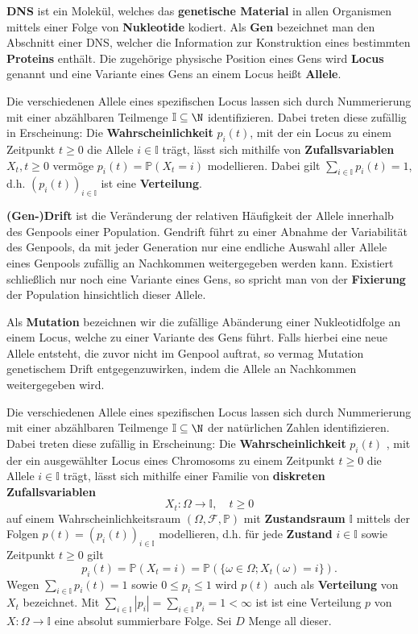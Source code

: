 \begin{bem}
\textbf{DNS} ist ein Molekül, welches das \textbf{genetische Material} in allen Organismen mittels einer Folge von \textbf{Nukleotide} kodiert. Als \textbf{Gen} bezeichnet man den Abschnitt einer DNS, welcher die Information zur Konstruktion eines bestimmten \textbf{Proteins} enthält. Die zugehörige physische Position eines Gens  wird \textbf{Locus} genannt und eine Variante eines Gens an einem Locus heißt  \textbf{Allele}.

\par Die verschiedenen Allele eines spezifischen Locus lassen sich durch Nummerierung mit einer abzählbaren Teilmenge $\mathbb I\subseteq \N$ identifizieren. Dabei treten diese zufällig in  Erscheinung: Die \textbf{Wahrscheinlichkeit} $p_i(t)$, mit der ein  Locus zu einem Zeitpunkt $t\geq 0$ die Allele $i\in\mathbb I$ trägt, lässt sich mithilfe von   \textbf{Zufallsvariablen} $X_t, t\geq0$ vermöge $p_i(t)=\mathbb P(X_t=i)$ modellieren. Dabei gilt $\sum_{i\in\mathbb I}p_i(t)=1$, d.h. $(p_i(t))_{i\in\mathbb I}$ ist eine \textbf{Verteilung}.

  \par \textbf{(Gen-)Drift} ist die Veränderung der relativen Häufigkeit der  Allele innerhalb des Genpools einer Population. Gendrift führt zu einer Abnahme der Variabilität des Genpools, da mit jeder Generation nur eine endliche Auswahl aller Allele eines Genpools zufällig an Nachkommen weitergegeben werden kann. Existiert schließlich nur noch eine Variante eines Gens, so spricht man von der \textbf{Fixierung} der Population hinsichtlich dieser Allele.
  
  \par  Als \textbf{Mutation} bezeichnen wir die zufällige Abänderung einer Nukleotidfolge an einem Locus, welche zu einer Variante des Gens führt. Falls hierbei eine neue Allele entsteht, die zuvor nicht im Genpool auftrat, so vermag Mutation genetischem Drift entgegenzuwirken, indem die Allele an Nachkommen weitergegeben wird.



  \par Die verschiedenen Allele eines spezifischen Locus lassen sich durch Nummerierung mit einer abzählbaren Teilmenge $\mathbb I\subseteq \N$ der natürlichen Zahlen identifizieren. Dabei treten diese zufällig in  Erscheinung: Die \textbf{Wahrscheinlichkeit} $p_i(t)$ , mit der ein ausgewählter Locus eines Chromosoms zu einem Zeitpunkt $t\geq 0$ die Allele $i\in\mathbb I$ trägt, lässt sich mithilfe einer Familie von  \textbf{diskreten Zufallsvariablen} $$X_t\colon\Omega\to \mathbb I,\quad t\geq0$$ auf einem Wahrscheinlichkeitsraum $(\Omega,\mathcal F, \mathbb P)$  mit \textbf{Zustandsraum} $\mathbb I$ mittels der Folgen $p(t)=(p_i(t))_{i\in\mathbb I}$ modellieren, d.h. für jede \textbf{Zustand} $i\in\mathbb I$ sowie Zeitpunkt $t\geq 0$ gilt
  $$p_i(t)=\mathbb P(X_t=i)=\mathbb P(\{\omega\in \Omega; X_t(\omega)=i\}).$$ Wegen $\sum_{i\in\mathbb I}p_i(t)=1$ sowie $0\leq p_i\leq 1$ wird $p(t)$ auch als \textbf{Verteilung} von $X_t$ bezeichnet.  Mit $\sum_{i\in\mathbb I}|p_i|=\sum_{i\in\mathbb I}p_i=1<\infty$ ist ist eine Verteilung $p$ von $X\colon\Omega\to\mathbb I$ eine absolut summierbare Folge. Sei $D$ Menge all dieser.


\end{bem}
